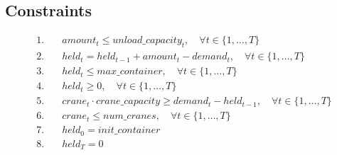\documentclass{article}
\begin{document}
\subsection*{Constraints}
\begin{align*}
1. & \quad amount_t \leq unload\_capacity_t, \quad \forall t \in \{1, \ldots, T\} \\
2. & \quad held_t = held_{t-1} + amount_t - demand_t, \quad \forall t \in \{1, \ldots, T\} \\
3. & \quad held_t \leq max\_container, \quad \forall t \in \{1, \ldots, T\} \\
4. & \quad held_t \geq 0, \quad \forall t \in \{1, \ldots, T\} \\
5. & \quad crane_t \cdot crane\_capacity \geq demand_t - held_{t-1}, \quad \forall t \in \{1, \ldots, T\} \\
6. & \quad crane_t \leq num\_cranes, \quad \forall t \in \{1, \ldots, T\} \\
7. & \quad held_0 = init\_container \\
8. & \quad held_T = 0
\end{align*}
\end{document}
